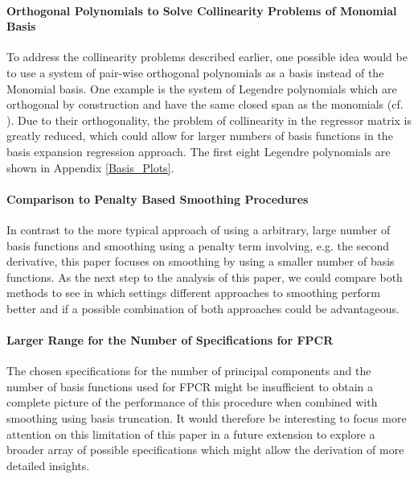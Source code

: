 \documentclass[11pt,twoside,a4paper]{article}
\begin{document}
	\paragraph{Orthogonal Polynomials to Solve Collinearity Problems of Monomial Basis}
	To address the collinearity problems described earlier, one possible idea would be to use a system of pair-wise orthogonal polynomials as a basis instead of the Monomial basis. One example is the system of Legendre polynomials which are orthogonal by construction and have the same closed span as the monomials (cf. \cite{Dattoli_2001}). Due to their orthogonality, the problem of collinearity in the regressor matrix is greatly reduced, which could allow for larger numbers of basis functions in the basis expansion regression approach. The first eight Legendre polynomials are shown in Appendix \ref{Basis_Plots}.
	\vspace{-0.2cm}
	
	\paragraph{Comparison to Penalty Based Smoothing Procedures}
	In contrast to the more typical approach of using a arbitrary, large number of basis functions and smoothing using a penalty term involving, e.g. the second derivative, this paper focuses on smoothing by using a smaller number of basis functions. As the next step to the analysis of this paper, we could compare both methods to see in which settings different approaches to smoothing perform better and if a possible combination of both approaches could be advantageous.
	\vspace{-0.2cm}
	
	\paragraph{Larger Range for the Number of Specifications for FPCR}
	The chosen specifications for the number of principal components and the number of basis functions used for FPCR might be insufficient to obtain a complete picture of the performance of this procedure when combined with smoothing using basis truncation. It would therefore be interesting to focus more attention on this limitation of this paper in a future extension to explore a broader array of possible specifications which might allow the derivation of more detailed insights.
	\vspace{-0.2cm}
	
\end{document}
